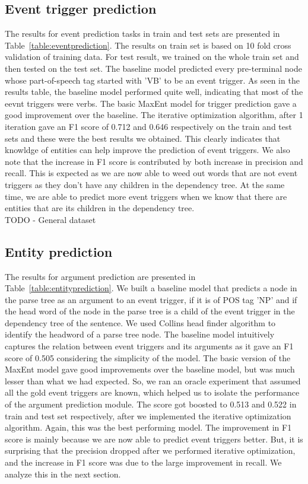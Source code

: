 \subsection{Event trigger prediction}
The results for event prediction tasks in train and test sets are presented in Table~\ref{table:eventprediction}. The results on train set is based on 10 fold cross validation of training data. For test result, we trained on the whole train set and then tested on the test set. The baseline model predicted every pre-terminal node whose part-of-speech tag started with 'VB' to be an event trigger. As seen in the results table, the baseline model performed quite well, indicating that most of the eevnt triggers were verbs. The basic MaxEnt model for trigger prediction gave a good improvement over the baseline. The iterative optimization algorithm, after 1 iteration gave an F1 score of 0.712 and 0.646 respectively on the train and test sets and these were the best results we obtained. This clearly indicates that knowldge of entities can help improve the prediction of event triggers. We also note that the increase in F1 score is contributed by both increase in precision and recall. This is expected as we are now able to weed out words that are not event triggers as they don't have any children in the dependency tree. At the same time, we are able to predict more event triggers when we know that there are entities that are its children in the dependency tree.\\

TODO - General dataset

\subsection{Entity prediction}
The results for argument prediction are presented in Table~\ref{table:entityprediction}. We built a baseline model that predicts a node in the parse tree as an argument to an event trigger, if it is of POS tag 'NP' and if the head word of the node in the parse tree is a child of the event trigger in the dependency tree of the sentence. We used Collins head finder algorithm to identify the headword of a parse tree node. The baseline model intuitively captures the relation between event triggers and its arguments as it gave an F1 score of 0.505 considering the simplicity of the model. The basic version of the MaxEnt model gave good improvements over the baseline model, but was much lesser than what we had expected. So, we ran an oracle experiment that assumed all the gold event triggers are known, which helped us to isolate the performance of the argument prediction module. The score got boosted to 0.513 and 0.522 in train and test set respectively, after we implemented the iterative optimization algorithm. Again, this was the best performing model. The improvement in F1 score is mainly because we are now able to predict event triggers better. But, it is surprising that the precision dropped after we performed iterative optimization, and the increase in F1 score was due to the large improvement in recall. We analyze this in the next section.\\

